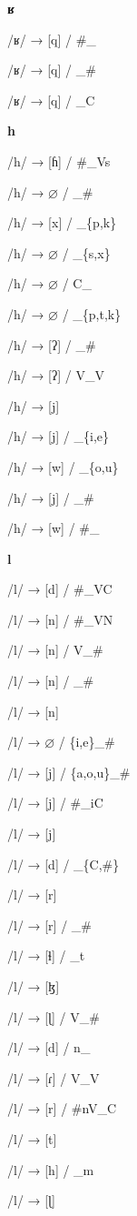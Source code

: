 \begin{center}\textbf{ʁ}\end{center}
\begin{multicols}{4}
\noindent /ʁ/ → [q] / \#\_

\noindent /ʁ/ → [q] / \_\#

\noindent /ʁ/ → [q] / \_C
\end{multicols}


\begin{center}\textbf{h}\end{center}
\begin{multicols}{4}
\noindent /h/ → [ɦ] / \#\_Vs

\noindent /h/ → $\varnothing$ / \_\#

\noindent /h/ → [x] / \_\{p,k\}

\noindent /h/ → $\varnothing$ / \_\{s,x\}

\noindent /h/ → $\varnothing$ / C\_

\noindent /h/ → $\varnothing$ / \_\{p,t,k\}

\noindent /h/ → [ʔ] / \_\#

\noindent /h/ → [ʔ] / V\_V

\noindent /h/ → [j]

\noindent /h/ → [j] / \_\{i,e\}

\noindent /h/ → [w] / \_\{o,u\}

\noindent /h/ → [j] / \_\#

\noindent /h/ → [w] / \#\_

\end{multicols}

\begin{center}\textbf{l}\end{center}
\begin{multicols}{4}
\noindent /l/ → [d] / \#\_VC

\noindent /l/ → [n] / \#\_VN

\noindent /l/ → [n] / V\_\#

\noindent /l/ → [n] / \_\#

\noindent /l/ → [n]

\noindent /l/ → $\varnothing$ / \{i,e\}\_\#

\noindent /l/ → [j] / \{a,o,u\}\_\#

\noindent /l/ → [j] / \#\_iC

\noindent /l/ → [j]

\noindent /l/ → [d] / \_\{C,\#\}

\noindent /l/ → [r]

\noindent /l/ → [r] / \_\#

\noindent /l/ → [ɬ] / \_t

\noindent /l/ → [ɮ]

\noindent /l/ → [ɭ] / V\_\#

\noindent /l/ → [d] / n\_

\noindent /l/ → [ɾ] / V\_V

\noindent /l/ → [r] / \#nV\_C

\noindent /l/ → [t]

\noindent /l/ → [h] / \_m

\noindent /l/ → [ɭ]
\end{multicols}


